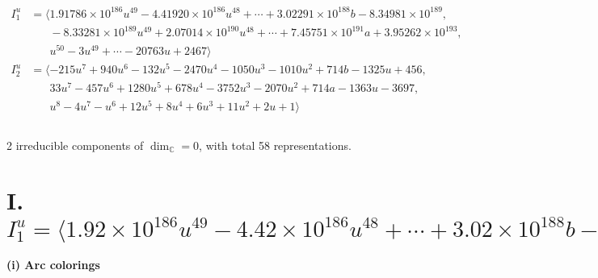 \documentclass[1p]{elsarticle_modified}
\theoremstyle{definition}
\begin{document}
\begin{align*}
I^u_{1}&=\langle 
1.91786\times10^{186} u^{49}-4.41920\times10^{186} u^{48}+\cdots+3.02291\times10^{188} b-8.34981\times10^{189},\\
\phantom{I^u_{1}}&\phantom{= \langle  }-8.33281\times10^{189} u^{49}+2.07014\times10^{190} u^{48}+\cdots+7.45751\times10^{191} a+3.95262\times10^{193},\\
\phantom{I^u_{1}}&\phantom{= \langle  }u^{50}-3 u^{49}+\cdots-20763 u+2467\rangle \\
I^u_{2}&=\langle 
-215 u^7+940 u^6-132 u^5-2470 u^4-1050 u^3-1010 u^2+714 b-1325 u+456,\\
\phantom{I^u_{2}}&\phantom{= \langle  }33 u^7-457 u^6+1280 u^5+678 u^4-3752 u^3-2070 u^2+714 a-1363 u-3697,\\
\phantom{I^u_{2}}&\phantom{= \langle  }u^8-4 u^7- u^6+12 u^5+8 u^4+6 u^3+11 u^2+2 u+1\rangle \\
\\
\end{align*}
\raggedright * 2 irreducible components of $\dim_{\mathbb{C}}=0$, with total 58 representations.\\
\newpage
\renewcommand{\arraystretch}{1}
\centering \section*{I. $I^u_{1}= \langle 1.92\times10^{186} u^{49}-4.42\times10^{186} u^{48}+\cdots+3.02\times10^{188} b-8.35\times10^{189},\;-8.33\times10^{189} u^{49}+2.07\times10^{190} u^{48}+\cdots+7.46\times10^{191} a+3.95\times10^{193},\;u^{50}-3 u^{49}+\cdots-20763 u+2467 \rangle$}
\flushleft \textbf{(i) Arc colorings}\\
\end{document}
